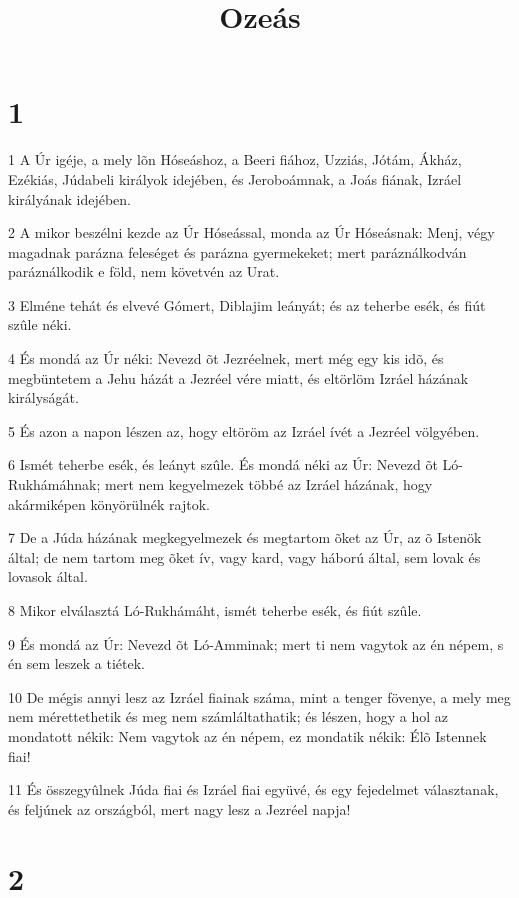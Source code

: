 

\title{Ozeás}


\chapter{1}

\par 1 A Úr igéje, a mely lõn Hóseáshoz, a Beeri fiához, Uzziás, Jótám, Ákház, Ezékiás, Júdabeli királyok idejében, és Jeroboámnak, a Joás fiának, Izráel királyának idejében.
\par 2 A mikor beszélni kezde az Úr Hóseással, monda az Úr Hóseásnak: Menj, végy magadnak parázna feleséget és parázna gyermekeket; mert paráználkodván paráználkodik e föld, nem követvén az Urat.
\par 3 Elméne tehát és elvevé Gómert, Diblajim leányát; és az teherbe esék, és fiút szûle néki.
\par 4 És mondá az Úr néki: Nevezd õt Jezréelnek, mert még egy kis idõ, és megbüntetem a Jehu házát a Jezréel vére miatt, és eltörlöm Izráel házának királyságát.
\par 5 És azon a napon lészen az, hogy eltöröm az Izráel ívét a Jezréel völgyében.
\par 6 Ismét teherbe esék, és leányt szûle. És mondá néki az Úr: Nevezd õt Ló-Rukhámáhnak; mert nem kegyelmezek többé az Izráel házának, hogy akármiképen könyörülnék rajtok.
\par 7 De a Júda házának megkegyelmezek és megtartom õket az Úr, az õ Istenök által; de nem tartom meg õket ív, vagy kard, vagy háború által, sem lovak és lovasok által.
\par 8 Mikor elválasztá Ló-Rukhámáht, ismét teherbe esék, és fiút szûle.
\par 9 És mondá az Úr: Nevezd õt Ló-Amminak; mert ti nem vagytok az én népem, s én sem leszek a tiétek.
\par 10 De mégis annyi lesz az Izráel fiainak száma, mint a tenger fövenye, a mely meg nem mérettethetik és meg nem számláltathatik; és lészen, hogy a hol az mondatott nékik: Nem vagytok az én népem, ez mondatik nékik: Élõ Istennek fiai!
\par 11 És összegyûlnek Júda fiai és Izráel fiai együvé, és egy fejedelmet választanak, és feljúnek az országból, mert nagy lesz a Jezréel napja!

\chapter{2}

